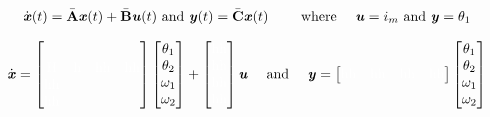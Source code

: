 \begin{equation}
\dot{\text{\textit{\textbf{x}}}}(t) = \bar{\text{\textbf{A}}}\text{\textit{\textbf{x}}}(t) +  \bar{\text{\textbf{B}}}\text{\textit{\textbf{u}}}(t) \text{ and } \text{\textit{\textbf{y}}}(t) = \bar{\text{\textbf{C}}}\text{\textit{\textbf{x}}}(t) \qquad \text{ where } \quad \text{\textit{\textbf{u}}}=i_m \text{ and \textit{\textbf{y}}}=\theta_1
\end{equation}

\begin{equation}
\dot{\text{\textit{\textbf{x}}}} = \begin{bmatrix}
& & & \\[0.3em]
\text{\color{white}H\color{black}} &\text{\color{white}h\color{black}} &\text{\color{white}hh\color{black}} &\text{\color{white}hh\color{black}} \\
\text{\color{white}hh\color{black}}& & & \\
\text{\color{white}hh\color{black}} & & &
\end{bmatrix}
\begin{bmatrix}
\theta_1\\
\theta_2\\
\omega_1\\
\omega_2\\
\end{bmatrix}
+
\begin{bmatrix}
\text{\color{white}hh\color{black}}\\
\text{\color{white}hh\color{black}}\\
\text{\color{white}hh\color{black}}\\
\text{\color{white}hh\color{black}}\\
\end{bmatrix}\text{\textit{\textbf{u}}}
\quad \text{ and } \quad
\text{\textit{\textbf{y}}}=\begin{bmatrix}
\text{\color{white}hh\color{black}} &\text{\color{white}hh\color{black}}&\text{\color{white}hh\color{black}}&\text{\color{white}hh\color{black}}
\end{bmatrix}
\begin{bmatrix}
\theta_1\\
\theta_2\\
\omega_1\\
\omega_2\\
\end{bmatrix}
\label{eq:4}
\end{equation}




